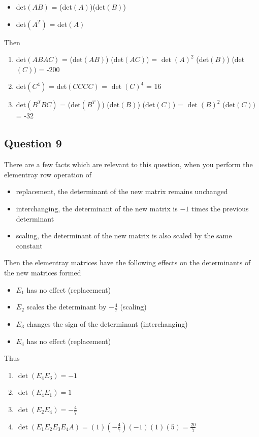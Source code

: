 \documentclass{article}
\begin{document}
\begin{itemize}
    \item det\((AB)\) = (det\((A)\))(det\((B)\))
    \item det\((A^T)\) = det\((A)\)
\end{itemize}

Then 
\begin{enumerate}
    \item det\((ABAC)\) = (det\((AB)\)) (det\((AC)\)) = \(\det{(A)}^2\) (det\((B)\)) (det\((C))\) = -200
    \item det\((C^4)\) = det\((CCCC)\) = \(\det{(C)}^4\) = 16
    \item det\((B^TBC)\) = (det\((B^T)\)) (det\((B)\)) (det\((C)\)) = \(\det{(B)}^2\) (det\((C))\) = -32
\end{enumerate}

\subsection*{Question 9}
There are a few facts which are relevant to this question, when you perform the elementray row operation of 
\begin{itemize}
    \item replacement, the determinant of the new matrix remains unchanged
    \item interchanging, the determinant of the new matrix is \(-1\) times the previous determinant
    \item scaling, the determinant of the new matrix is also scaled by the same constant
\end{itemize}


Then the elementray matrices have the following effects on the determinants of the new matrices formed
\begin{itemize}
    \item \(E_1\) has no effect (replacement)
    \item \(E_2\) scales the determinant by \(-\frac{4}{7}\) (scaling)
    \item \(E_3\) changes the sign of the determinant (interchanging)
    \item \(E_4\) has no effect (replacement)
\end{itemize}


Thus
\begin{enumerate}
    \item \(\det{(E_4E_3)} = -1\)
    \item \(\det{(E_4E_1)} = 1\)
    \item \(\det{(E_2E_4)} = -\frac{4}{7}\)
    \item \(\det{(E_1E_2E_3E_4A)} = (1)(-\frac{4}{7})(-1)(1)(5) = \frac{20}{7}\) 
\end{enumerate}
\end{document}

